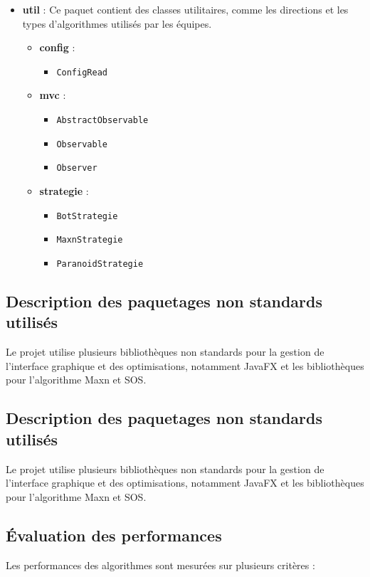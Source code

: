 \documentclass[a4paper,12pt]{article}
\begin{document}
\begin{itemize}
    \item \textbf{util} : Ce paquet contient des classes utilitaires, comme les directions et les types d’algorithmes utilisés par les équipes.
    \begin{itemize}
        \item \textbf{config} :
        \begin{itemize}
            \item \texttt{ConfigRead}
        \end{itemize}
        \item \textbf{mvc} :
        \begin{itemize}
            \item \texttt{AbstractObservable}
            \item \texttt{Observable}
            \item \texttt{Observer}
        \end{itemize}
        \item \textbf{strategie} :
        \begin{itemize}
            \item \texttt{BotStrategie}
            \item \texttt{MaxnStrategie}
            \item \texttt{ParanoidStrategie}
        \end{itemize}
    \end{itemize}
\end{itemize}

\subsection{Description des paquetages non standards utilisés}
Le projet utilise plusieurs bibliothèques non standards pour la gestion de l’interface graphique et des optimisations, notamment JavaFX et les bibliothèques pour l’algorithme Maxn et SOS.


\subsection{Description des paquetages non standards utilisés}
Le projet utilise plusieurs bibliothèques non standards pour la gestion de l’interface graphique et des optimisations, notamment JavaFX et les bibliothèques pour l’algorithme Maxn et SOS.

\newpage

\subsection{Évaluation des performances}
Les performances des algorithmes sont mesurées sur plusieurs critères :
\end{document}
